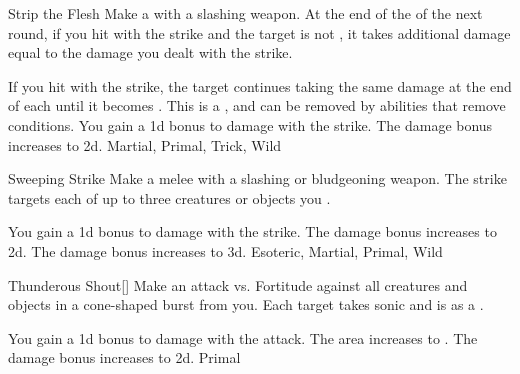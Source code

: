 \lowercase{\hypertarget{maneuver:Strip the Flesh}{}}\label{maneuver:Strip the Flesh}
\begin{apability}{\hypertarget{maneuver:Strip the Flesh}{Strip the Flesh}}
Make a  with a slashing weapon.
At the end of the  of the next round,
if you hit with the strike and the target is not ,
it takes additional damage equal to the damage you dealt with the strike.

\rankline
{} If you hit with the strike, the target continues taking the same damage
at the end of each  until it becomes .
This is a , and can be removed by abilities that remove conditions.
 You gain a \plus1d bonus to damage with the strike.
 The damage bonus increases to \plus2d.
 Martial, Primal, Trick, Wild
\end{apability}
\vspace{0.25em}



\lowercase{\hypertarget{maneuver:Sweeping Strike}{}}\label{maneuver:Sweeping Strike}
\begin{apability}{\hypertarget{maneuver:Sweeping Strike}{Sweeping Strike}}
Make a melee  with a slashing or bludgeoning weapon.
The strike targets each of up to three creatures or objects you .

\rankline
{} You gain a \plus1d bonus to damage with the strike.
 The damage bonus increases to \plus2d.
 The damage bonus increases to \plus3d.
 Esoteric, Martial, Primal, Wild
\end{apability}
\vspace{0.25em}



\lowercase{\hypertarget{maneuver:Thunderous Shout}{}}\label{maneuver:Thunderous Shout}
\begin{apability}{\hypertarget{maneuver:Thunderous Shout}{Thunderous Shout}}[]
Make an attack vs. Fortitude against all creatures and objects in a \areamed cone-shaped burst from you.
\hit Each target takes sonic  and is  as a .

\rankline
{} You gain a \plus1d bonus to damage with the attack.
 The area increases to \arealarge.
 The damage bonus increases to \plus2d.
 Primal
\end{apability}
\vspace{0.25em}



